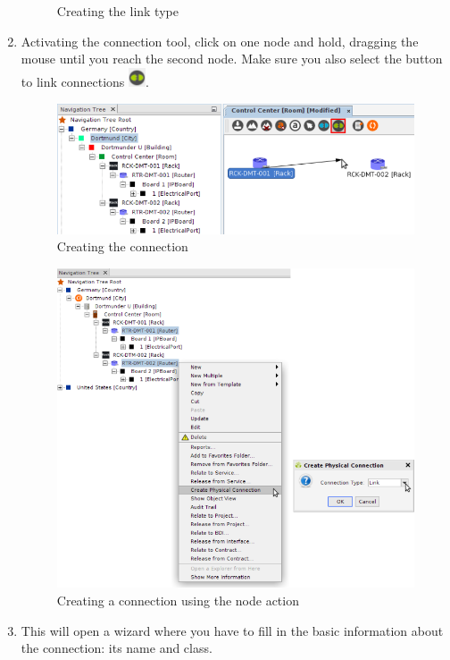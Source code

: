 \documentclass[a4paper]{article}
\begin{document}
\begin{enumerate}
\begin{figure}[h!]
					\caption{Creating the link type}
					\label{fig:l1_example_1_electrical_link_type}
				\end{figure}
				\item Activating the connection tool, click on one node and hold, dragging the mouse until you reach the second node. Make sure you also select the button to link connections \includegraphics[width=0.5cm]{img/object_view_link.png}.
				\begin{figure}[h!]
					\centering
					\includegraphics[width=0.8\linewidth]{img/l1_example_1_new_connection.png}
					\caption{Creating the connection}
					\label{fig:l1_example_1_new_connection}
				\end{figure}
				\begin{figure}[h!]
					\centering
					\includegraphics[width=0.7\linewidth]{img/actions_create_connection_link.png}
					\caption{Creating a connection using the node action}
					\label{fig:actions_create_connection_link}
				\end{figure}
				\item This will open a wizard where you have to fill in the basic information about the connection: its name and class.
				\begin{figure}[h!]

\end{figure}
\end{enumerate}
\end{document}

